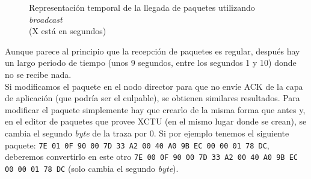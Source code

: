 \begin{figure}[!htb]
\centering
\captionsetup{justification=centering}


\caption{Representación temporal de la llegada de paquetes utilizando \textit{broadcast}\\
 (X está en segundos)} \label{fig:graficabroadcast}
\end{figure}

Aunque parece al principio que la recepción de paquetes es regular, después hay un largo
periodo de tiempo (unos 9 segundos, entre los segundos 1 y 10) donde no se recibe nada.\\

Si modificamos el paquete en el nodo director para que no envíe ACK de la capa de
aplicación (que podría ser el culpable), se obtienen similares resultados. Para modificar el paquete simplemente
hay que crearlo de la misma forma que antes y, en el editor de paquetes que provee XCTU
(en el mismo lugar donde se crean), se cambia el segundo \textit{byte} de la traza por 0. Si
por ejemplo tenemos el siguiente paquete:  \texttt{7E 01 0F 90 00 7D 33 A2 00 40 A0 9B EC 00 00 01 78 DC},
deberemos convertirlo en este otro  \texttt{7E 00 0F 90 00 7D 33 A2 00 40 A0 9B EC 00 00 01 78 DC}
(solo cambia el segundo \textit{byte}).

